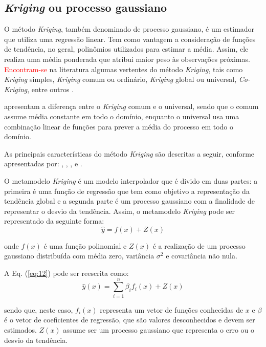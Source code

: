\subsection{\textit{Kriging} ou processo gaussiano}

O método {\it Kriging}, também denominado de processo gaussiano, é um estimador que utiliza uma regressão linear. {\color{red}Tem como vantagem a consideração de funções de tendência, no geral, polinômios utilizados para estimar a média}. Assim, ele realiza uma média ponderada que atribui maior peso às observações próximas. \textcolor{red}{Encontram-se} na literatura algumas vertentes do método {\it Kriging}, tais como {\it Kriging} simples, {\it Kriging} comum ou ordinário, {\it Kriging} global ou universal, {\it Co-Kriging}, entre outros \cite{noronha2016}.

 apresentam a diferença entre o {\it Kriging} comum e o universal, sendo que o comum assume média constante em todo o domínio, enquanto o universal usa uma combinação linear de funções para prever a média do processo em todo o domínio.    

As principais características do método {\it Kriging} são descritas a seguir, conforme apresentadas por: , , ,  e .

O metamodelo {\it Kriging} é um modelo interpolador que é divido em duas partes: a primeira é uma função de regressão que tem como objetivo a representação da tendência global e a segunda parte é um processo gaussiano com a finalidade de representar o desvio da tendência. Assim, o metamodelo {\it Kriging} pode ser representado da seguinte forma:
\begin{equation}
\hat{y}= {f(x)+Z(x)}
\label{eq:12}
\end{equation}

\noindent onde $f (x)$ é uma função polinomial e $Z (x)$ é a realização de um processo gaussiano distribuída com média zero, variância ${\sigma}^2$ e covariância não nula. 

A Eq. (\ref{eq:12}) pode ser reescrita como:
\begin{equation}
\hat{y}(x)=\sum_{i=1}^{n}{\beta_i}f_i(x)+Z(x)
\label{eq:13}
\end{equation}

\noindent sendo que, neste caso, $f_i(x)$ representa um vetor de funções conhecidas de $x$ e $\beta$ é o vetor de coeficientes de regressão, que são valores desconhecidos e devem ser estimados. $Z(x)$ assume ser um processo gaussiano que representa o erro ou o desvio da tendência.

